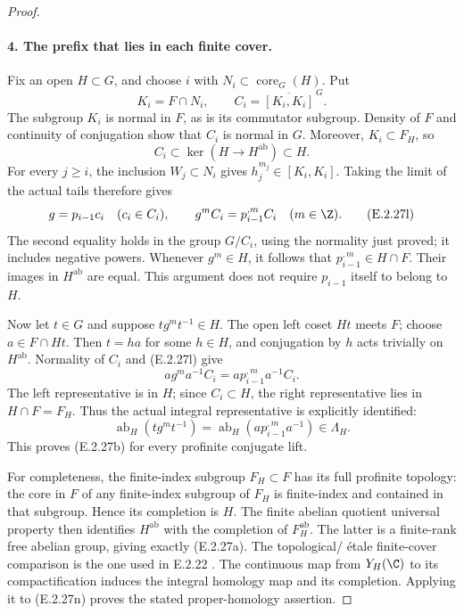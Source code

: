 \begin{proof}
\paragraph{4. The prefix that lies in each finite cover.}
Fix an open \(H\subset G\), and choose \(i\) with
\(N_i\subset\operatorname{core}_G(H)\). Put
\[
 K_i=F\cap N_i,\qquad C_i=\overline{[K_i,K_i]}^{\,G}.
 \tag{E.2.27j}
\]
The subgroup \(K_i\) is normal in \(F\), as is its commutator
subgroup. Density of \(F\) and continuity of conjugation show
that \(C_i\) is normal in \(G\). Moreover,
\(K_i\subset F_H\), so
\[
 C_i\subset\ker(H\longrightarrow H^{\mathrm{ab}})\subset H.
 \tag{E.2.27k}
\]
For every \(j\geq i\), the inclusion \(W_j\subset N_i\) gives
\(h_j^{m_j}\in[K_i,K_i]\). Taking the limit of the actual tails
therefore gives
\[
 g=p_{i-1}c_i\quad(c_i\in C_i),\qquad
 g^mC_i=p_{i-1}^{,m}C_i\quad(m\in\Z).
 \tag{E.2.27l}
\]
The second equality holds in the group \(G/C_i\), using the
normality just proved; it includes negative powers. Whenever
\(g^m\in H\), it follows that \(p_{i-1}^{,m}\in H\cap F\).
Their images in \(H^{\mathrm{ab}}\) are equal. This argument
does not require \(p_{i-1}\) itself to belong to \(H\).

Now let \(t\in G\) and suppose \(tg^mt^{-1}\in H\). The open
left coset \(Ht\) meets \(F\); choose \(a\in F\cap Ht\).
Then \(t=ha\) for some \(h\in H\), and conjugation by \(h\)
acts trivially on \(H^{\mathrm{ab}}\). Normality of \(C_i\)
and (E.2.27l) give
\[
 ag^ma^{-1}C_i=ap_{i-1}^{,m}a^{-1}C_i.
 \tag{E.2.27m}
\]
The left representative is in \(H\); since \(C_i\subset H\),
the right representative lies in \(H\cap F=F_H\).
Thus the actual integral representative is explicitly identified:
\[
 \operatorname{ab}_H(tg^mt^{-1})
   =\operatorname{ab}_H(ap_{i-1}^{,m}a^{-1})\in\Lambda_H.
 \tag{E.2.27n}
\]
This proves (E.2.27b) for every profinite conjugate lift.

For completeness, the finite-index subgroup \(F_H\subset F\)
has its full profinite topology: the core in \(F\) of any
finite-index subgroup of \(F_H\) is finite-index and contained
in that subgroup. Hence its completion is \(H\). The finite
abelian quotient universal property then identifies
\(H^{\mathrm{ab}}\) with the completion of \(F_H^{\mathrm{ab}}\).
The latter is a finite-rank free abelian group, giving exactly
(E.2.27a). The topological/
\'{e}tale finite-cover comparison is the one used in E.2.22
\cite[Corollary 3.7, p.~10]{OSU2024}.
The continuous map from \(Y_H(\C)\) to its compactification
induces the integral homology map and its completion. Applying
it to (E.2.27n) proves the stated proper-homology assertion.


\end{proof}
